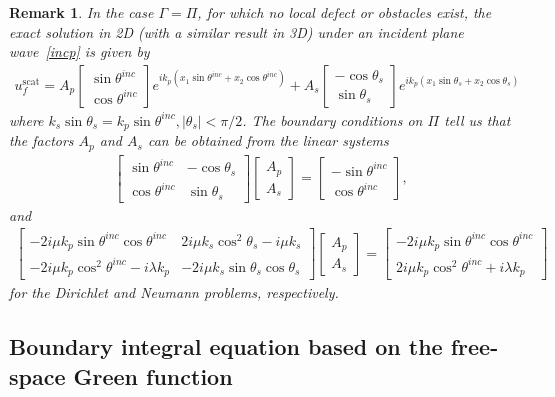 \documentclass[10pt]{article}
\numberwithin{equation}{section}
\newcommand{\ben}{\begin{eqnarray*}}
\newcommand{\enn}{\end{eqnarray*}}
\newtheorem{remark}[theorem]{Remark}
\begin{document}
\begin{remark}
  \label{remark_exact}
  In the case $\Gamma=\Pi$, for which no local defect or obstacles
  exist, the exact solution in 2D (with a similar result in 3D) under
  an incident plane wave~\eqref{incp} is given by
  \ben u^\mathrm{scat}_f=A_p\begin{bmatrix} \sin\theta^{inc}\\
    \cos\theta^{inc}
\end{bmatrix}e^{ik_p(x_1\sin\theta^{inc}+x_2\cos\theta^{inc})}+ A_s\begin{bmatrix}
-\cos\theta_s\\ \sin\theta_s
\end{bmatrix}e^{ik_p(x_1\sin\theta_s+x_2\cos\theta_s)} \enn where
$k_s\sin\theta_s=k_p\sin\theta^{inc}, |\theta_s|<\pi/2$. The boundary
conditions on $\Pi$ tell us that the factors $A_p$ and $A_s$ can be
obtained from the linear systems \ben
\begin{bmatrix}
\sin\theta^{inc} & -\cos\theta_s\\ \cos\theta^{inc} & \sin\theta_s
\end{bmatrix}\begin{bmatrix}
A_p\\ A_s
\end{bmatrix}=\begin{bmatrix}
-\sin\theta^{inc} \\ \cos\theta^{inc}
\end{bmatrix},
\enn
and
\ben
\begin{bmatrix}
-2i\mu k_p\sin\theta^{inc}\cos\theta^{inc} & 2i\mu k_s\cos^2\theta_s-i\mu k_s\\
-2i\mu k_p\cos^2\theta^{inc}-i\lambda k_p & -2i\mu k_s\sin\theta_s\cos\theta_s
\end{bmatrix}\begin{bmatrix}
A_p\\ A_s
\end{bmatrix}=\begin{bmatrix}
-2i\mu k_p\sin\theta^{inc}\cos\theta^{inc} \\ 2i\mu k_p\cos^2\theta^{inc}+i\lambda k_p
\end{bmatrix}
\enn
for the Dirichlet and Neumann problems, respectively.
\end{remark}

\subsection{Boundary integral equation based on the free-space Green function}
\label{sec:2.2}
\end{document}
